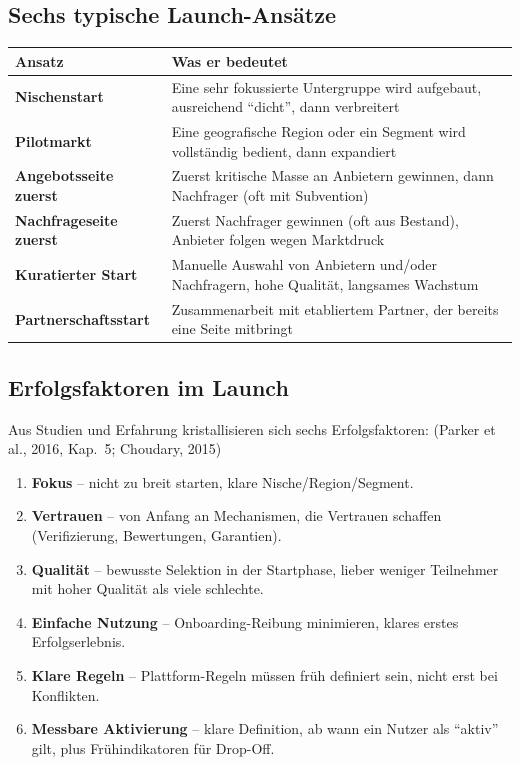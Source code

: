 \documentclass[11pt,a4paper,oneside]{article}
\newcommand{\fachbegriff}[1]{\textbf{#1}}
\newcommand{\quelle}[1]{{\footnotesize\color{lpGray}(#1)}}
\begin{document}
\subsection{Sechs typische Launch-Ansätze}

\begin{tabularx}{\linewidth}{@{}>{\bfseries}lX@{}}
\toprule
Ansatz & Was er bedeutet \\
\midrule
Nischenstart           & Eine sehr fokussierte Untergruppe wird aufgebaut, ausreichend ``dicht'', dann verbreitert \\
Pilotmarkt             & Eine geografische Region oder ein Segment wird vollständig bedient, dann expandiert \\
Angebotsseite zuerst   & Zuerst kritische Masse an Anbietern gewinnen, dann Nachfrager (oft mit Subvention) \\
Nachfrageseite zuerst  & Zuerst Nachfrager gewinnen (oft aus Bestand), Anbieter folgen wegen Marktdruck \\
Kuratierter Start      & Manuelle Auswahl von Anbietern und/oder Nachfragern, hohe Qualität, langsames Wachstum \\
Partnerschaftsstart    & Zusammenarbeit mit etabliertem Partner, der bereits eine Seite mitbringt \\
\bottomrule
\end{tabularx}

\subsection{Erfolgsfaktoren im Launch}

Aus Studien und Erfahrung kristallisieren sich sechs Erfolgsfaktoren: \quelle{Parker et al., 2016, Kap.~5; Choudary, 2015}

\begin{enumerate}
  \item \fachbegriff{Fokus} -- nicht zu breit starten, klare Nische/Region/Segment.
  \item \fachbegriff{Vertrauen} -- von Anfang an Mechanismen, die Vertrauen schaffen (Verifizierung, Bewertungen, Garantien).
  \item \fachbegriff{Qualität} -- bewusste Selektion in der Startphase, lieber weniger Teilnehmer mit hoher Qualität als viele schlechte.
  \item \fachbegriff{Einfache Nutzung} -- Onboarding-Reibung minimieren, klares erstes Erfolgserlebnis.
  \item \fachbegriff{Klare Regeln} -- Plattform-Regeln müssen früh definiert sein, nicht erst bei Konflikten.
  \item \fachbegriff{Messbare Aktivierung} -- klare Definition, ab wann ein Nutzer als ``aktiv'' gilt, plus Frühindikatoren für Drop-Off.
\end{enumerate}
\end{document}
